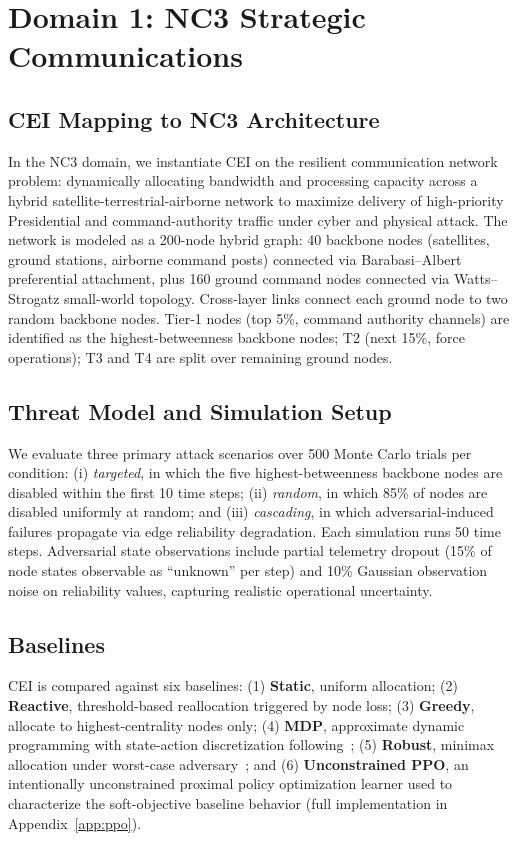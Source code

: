 \documentclass[runningheads]{llncs}
\begin{document}
\section{Domain 1: NC3 Strategic Communications}
\label{sec:nc3}

\subsection{CEI Mapping to NC3 Architecture}

In the NC3 domain, we instantiate CEI on the resilient communication network problem: dynamically allocating bandwidth and processing capacity across a hybrid satellite-terrestrial-airborne network to maximize delivery of high-priority Presidential and command-authority traffic under cyber and physical attack. The network is modeled as a 200-node hybrid graph: 40 backbone nodes (satellites, ground stations, airborne command posts) connected via Barabasi--Albert preferential attachment, plus 160 ground command nodes connected via Watts--Strogatz small-world topology. Cross-layer links connect each ground node to two random backbone nodes. Tier-1 nodes (top 5\%, command authority channels) are identified as the highest-betweenness backbone nodes; T2 (next 15\%, force operations); T3 and T4 are split over remaining ground nodes.

\subsection{Threat Model and Simulation Setup}

We evaluate three primary attack scenarios over 500 Monte Carlo trials per condition: (i) \emph{targeted}, in which the five highest-betweenness backbone nodes are disabled within the first 10 time steps; (ii) \emph{random}, in which 85\% of nodes are disabled uniformly at random; and (iii) \emph{cascading}, in which adversarial-induced failures propagate via edge reliability degradation. Each simulation runs 50 time steps. Adversarial state observations include partial telemetry dropout (15\% of node states observable as ``unknown'' per step) and 10\% Gaussian observation noise on reliability values, capturing realistic operational uncertainty.

\subsection{Baselines}

CEI is compared against six baselines: (1) \textbf{Static}, uniform allocation; (2) \textbf{Reactive}, threshold-based reallocation triggered by node loss; (3) \textbf{Greedy}, allocate to highest-centrality nodes only; (4) \textbf{MDP}, approximate dynamic programming with state-action discretization following~\cite{davis_adp}; (5) \textbf{Robust}, minimax allocation under worst-case adversary~\cite{nilim}; and (6) \textbf{Unconstrained PPO}, an intentionally unconstrained proximal policy optimization learner used to characterize the soft-objective baseline behavior (full implementation in Appendix~\ref{app:ppo}).
\end{document}
